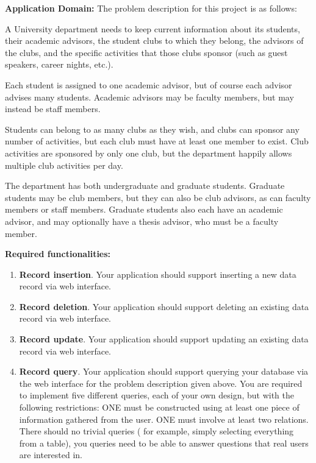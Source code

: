 \documentclass{article}
\begin{document}


\textbf{Application Domain:} 
The problem description for this project is as follows:

A University department needs to keep current information about
its students, their academic advisors, the student clubs to which they
belong, the advisors of the clubs, and the specific activities that
those clubs sponsor (such as guest speakers, career nights, etc.).

Each student is assigned to one academic advisor, but of course each
advisor advises many students.  Academic advisors may be faculty members,
but may instead be staff members.

Students can belong to as many clubs as they wish,
and clubs can sponsor any number of activities, but each club must have at
least one member to exist.  Club activities are sponsored by only one club,
but the department happily allows multiple club activities per day.

The department has both undergraduate and graduate students.  Graduate students
may be club members, but they can also be club advisors, as can faculty
members or staff members.  Graduate students also each have an academic
advisor, and may optionally have a thesis advisor, who must be a faculty
member.


\textbf{Required functionalities:}
\begin{enumerate}
\item \textbf{Record insertion}.
Your application should support inserting a new data record via web
interface.

\item \textbf{Record deletion}.
Your application should support deleting an existing data record via
web interface.

\item \textbf{Record update}.
Your application should support updating an existing data record via
web interface.

\item \textbf{Record query}.
Your application should support querying your database via the web
interface for the problem description given above.
You are required to implement five different queries, each of your own
design, but with the following restrictions: ONE must be constructed
using at least one piece of information gathered from the user. ONE
must involve at least two relations. There should no trivial queries (
for example, simply selecting everything from a table), you queries need
to be able to answer questions that real users are interested in.
\end{enumerate}
\end{document}
